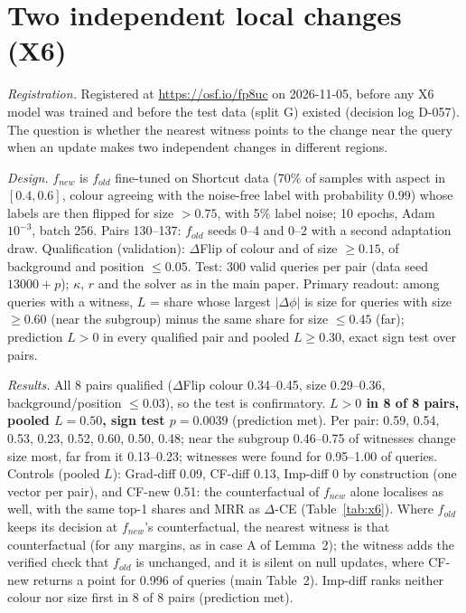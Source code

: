 \documentclass[10pt,a4paper]{article}
\theoremstyle{remark}
\newcommand{\DCE}{$\Delta$-CE}
\begin{document}
\section{Two independent local changes (X6)}\label{sec:x6}

\emph{Registration.} Registered at \url{https://osf.io/fp8uc} on 2026-11-05, before any X6 model was trained and before the test data (split G) existed (decision log D-057). The question is whether the nearest witness points to the change near the query when an update makes two independent changes in different regions.

\emph{Design.} $f_{new}$ is $f_{old}$ fine-tuned on Shortcut data (70\% of samples with aspect in $[0.4,0.6]$, colour agreeing with the noise-free label with probability 0.99) whose labels are then flipped for size $>0.75$, with 5\% label noise; 10 epochs, Adam $10^{-3}$, batch 256. Pairs 130--137: $f_{old}$ seeds 0--4 and 0--2 with a second adaptation draw. Qualification (validation): $\Delta$Flip of colour and of size $\ge0.15$, of background and position $\le0.05$. Test: 300 valid queries per pair (data seed $13000+p$); $\kappa$, $r$ and the solver as in the main paper. Primary readout: among queries with a witness, $L$ = share whose largest $|\Delta\phi|$ is size for queries with size $\ge0.60$ (near the subgroup) minus the same share for size $\le0.45$ (far); prediction $L>0$ in every qualified pair and pooled $L\ge0.30$, exact sign test over pairs.

\emph{Results.} All 8 pairs qualified ($\Delta$Flip colour 0.34--0.45, size 0.29--0.36, background/position $\le0.03$), so the test is confirmatory. \textbf{$L>0$ in 8 of 8 pairs, pooled $L=0.50$, sign test $p=0.0039$} (prediction met). Per pair: 0.59, 0.54, 0.53, 0.23, 0.52, 0.60, 0.50, 0.48; near the subgroup 0.46--0.75 of witnesses change size most, far from it 0.13--0.23; witnesses were found for 0.95--1.00 of queries. Controls (pooled $L$): Grad-diff 0.09, CF-diff 0.13, Imp-diff 0 by construction (one vector per pair), and CF-new 0.51: the counterfactual of $f_{new}$ alone localises as well, with the same top-1 shares and MRR as \DCE{} (Table~\ref{tab:x6}). Where $f_{old}$ keeps its decision at $f_{new}$'s counterfactual, the nearest witness is that counterfactual (for any margins, as in case A of Lemma~2); the witness adds the verified check that $f_{old}$ is unchanged, and it is silent on null updates, where CF-new returns a point for 0.996 of queries (main Table~2). Imp-diff ranks neither colour nor size first in 8 of 8 pairs (prediction met).
\end{document}
